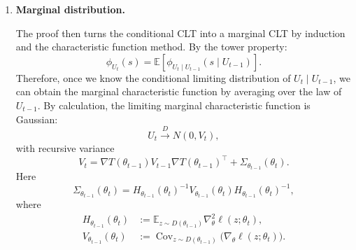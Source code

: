 \documentclass[../../../main.tex]{subfiles}
\begin{document}
\begin{msbproblem}
\begin{answerkey}
\begin{enumerate}
\begin{enumerate}
    \item \textbf{Marginal distribution.}

    The proof then turns the conditional CLT into a marginal CLT by induction
    and the characteristic function method. By the tower
    property:
    \[
        \phi_{U_t}(s)
        =
        \mathbb{E}\left[
            \phi_{U_t\mid U_{t-1}}(s\mid U_{t-1})
        \right].
    \]
    Therefore, once we know the conditional limiting distribution of
    $U_t\mid U_{t-1}$, we can obtain the marginal characteristic function by averaging over the law of $U_{t-1}$.
    By calculation, the limiting marginal characteristic function is
    Gaussian:
    \[
        U_t\xrightarrow{D}N(0,V_t),
    \]
    with recursive variance
    \[
        V_t
        =
        \nabla T(\theta_{t-1})V_{t-1}\nabla T(\theta_{t-1})^\top
        +
        \Sigma_{\theta_{t-1}}(\theta_t).
    \]
    Here
    \[
        \Sigma_{\theta_{t-1}}(\theta_t)
        =
        H_{\theta_{t-1}}(\theta_t)^{-1}
        V_{\theta_{t-1}}(\theta_t)
        H_{\theta_{t-1}}(\theta_t)^{-1},
    \]
    where
    \begin{align*}
        H_{\theta_{t-1}}(\theta_t)
        &:=
        \mathbb{E}_{z\sim D(\theta_{t-1})} \nabla_\theta^2\ell(z;\theta_t), \\
        V_{\theta_{t-1}}(\theta_t)
        &:=
        \operatorname{Cov}_{z\sim D(\theta_{t-1})}
        \bigl(\nabla_\theta \ell(z;\theta_t)\bigr).
    \end{align*}
    
\end{enumerate}

\end{enumerate}


\end{answerkey}

\begin{gradingscheme}


\end{gradingscheme}
\end{msbproblem}
\end{document}
